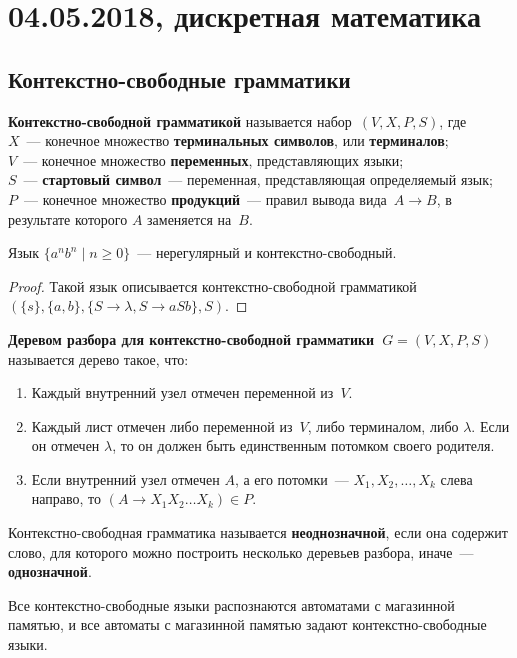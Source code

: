 \chapter{04.05.2018, дискретная математика}
\section{Контекстно-свободные грамматики}
\textbf{Контекстно-свободной грамматикой} называется набор~$(V, X, P, S)$, где\\
$X$~--- конечное множество \textbf{терминальных символов}, или \textbf{терминалов};\\
$V$~--- конечное множество \textbf{переменных}, представляющих языки;\\
$S$~--- \textbf{стартовый символ}~--- переменная, представляющая определяемый язык;\\
$P$~--- конечное множество \textbf{продукций}~--- правил вывода вида~$A \to B$, в результате которого $A$ заменяется на~$B$.

\begin{theorem}
Язык $\{ a^n b^n \mid n \geqslant 0 \}$~--- нерегулярный и контекстно-свободный.
\end{theorem}
\begin{proof}
Такой язык описывается контекстно-свободной грамматикой~$(\{ s \}, \{ a, b \}, \{ S \to \lambda, S \to aSb \}, S)$.
\end{proof}

\textbf{Деревом разбора для контекстно-свободной грамматики~$G = (V, X, P, S)$} называется дерево такое, что:
\begin{enumerate}
	\item Каждый внутренний узел отмечен переменной из~$V$.
	\item Каждый лист отмечен либо переменной из~$V$, либо терминалом, либо $\lambda$.
	Если он отмечен $\lambda$, то он должен быть единственным потомком своего родителя.
	\item Если внутренний узел отмечен $A$, а его потомки~--- $X_1, X_2, \ldots, X_k$ слева направо, то $(A \to X_1 X_2 \ldots X_k) \in P$.
\end{enumerate}

Контекстно-свободная грамматика называется \textbf{неоднозначной}, если она содержит слово, для которого можно построить несколько деревьев разбора, иначе~--- \textbf{однозначной}.

\begin{theorem}
Все контекстно-свободные языки распознаются автоматами с магазинной памятью, и все автоматы с магазинной памятью задают контекстно-свободные языки.
\end{theorem}
